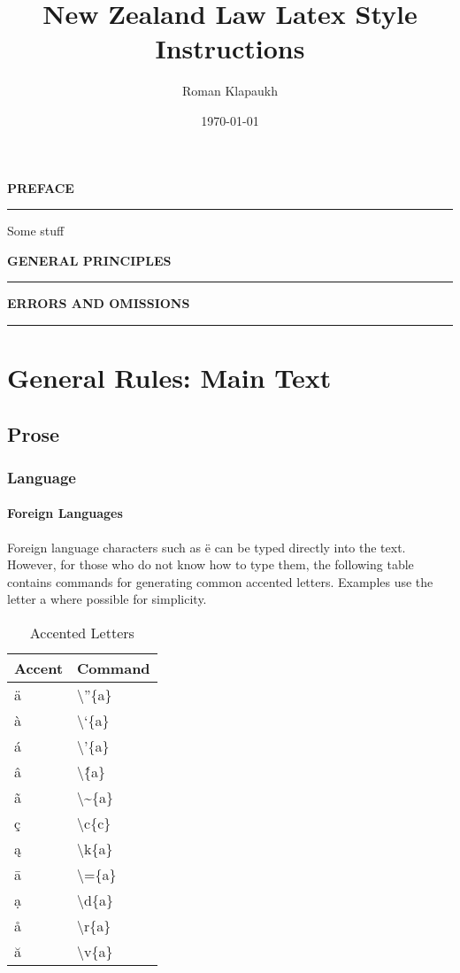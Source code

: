 \documentclass{book}
\newcommand{\s}{\textbackslash}
\begin{document}
\title{New Zealand Law Latex Style Instructions}
\author{Roman Klapaukh}
\date{\today}
\frontmatter
\pagestyle{fancy}

\maketitle


\tableofcontents

\newpage
{}
{\noindent\large\bfseries\MakeUppercase{Preface}\hrule \vspace{2ex}}
Some stuff

{\noindent\large\bfseries\MakeUppercase{General Principles} \hrule\vspace{2ex}}

{\noindent\large\bfseries\MakeUppercase{Errors and Omissions}\hrule\vspace{2ex}}

\mainmatter
\chapter{General Rules: Main Text}
\section{Prose}
\subsection{Language}

\subsubsection{Foreign Languages}
Foreign language characters such as \"{e} can be typed directly into the  text. However, for those who do not know how to type them, the following table contains commands for generating common accented letters. Examples use the letter a where possible for simplicity.

\begin{table}[H]
\centering
\begin{tabular}{|l|l|}
\hline
Accent & Command \\ \hline
\"{a} & \s''\{a\} \\
\`{a} & \s`\{a\} \\
\'{a} & \s'\{a\} \\
\^{a} & \s\^\{a\}\\
\~{a} & \s\textasciitilde\{a\}\\
\c{c} & {\s}c\{c\}\\
\k{a} & {\s}k\{a\}\\
\={a} & \s=\{a\}\\
\d{a} & {\s}d\{a\}\\
\r{a} & {\s}r\{a\}\\
\u{a} & {\s}v\{a\}\\
\hline
\end{tabular}
\caption{Accented Letters}
\end{table}
\end{document}
